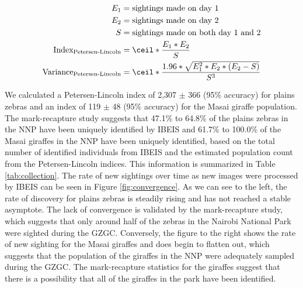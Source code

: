 \begin{equation}
	\label{eq:index}
	\begin{split}
		E_1 & = \text{sightings made on day 1} \\
		E_2 & = \text{sightings made on day 2} \\
		S & =  \text{sightings made on both day 1 and 2} \\
		\text{Index}_\text{Petersen-Lincoln} & = \ceil*{ \dfrac{E_1 * E_2}{S} } \\
		\text{Variance}_\text{Petersen-Lincoln} & = \ceil*{ \dfrac{1.96 * \sqrt{E_1^2 * E_2 * (E_2 - S)}}{S^3} } \\
	\end{split}
\end{equation}

We calculated a Petersen-Lincoln index of 2,307 $\pm$ 366 (95\% accuracy) for plains zebras and an index of 119 $\pm$ 48 (95\% accuracy) for the Masai giraffe population.  The mark-recapture study suggests that 47.1\% to 64.8\% of the  plains zebras in the NNP have been uniquely identified by IBEIS and 61.7\% to 100.0\% of the Masai giraffes in the NNP have been uniquely identified, based on the total number of identified individuals from IBEIS and the estimated population count from the Petersen-Lincoln indices.  This information is summarized in Table \ref{tab:collection}.  The rate of new sightings over time as new images were processed by IBEIS can be seen in Figure \ref{fig:convergence}.  As we can see to the left, the rate of discovery for plains zebras is steadily rising and has not reached a stable asymptote.  The lack of convergence is validated by the mark-recapture study, which suggests that only around half of the zebras in the Nairobi National Park were sighted during the GZGC.  Conversely, the figure to the right shows the rate of new sighting for the Masai giraffes and does begin to flatten out, which suggests that the population of the giraffes in the NNP were adequately sampled during the GZGC.  The mark-recapture statistics for the giraffes suggest that there is a possibility that all of the giraffes in the park have been identified.

